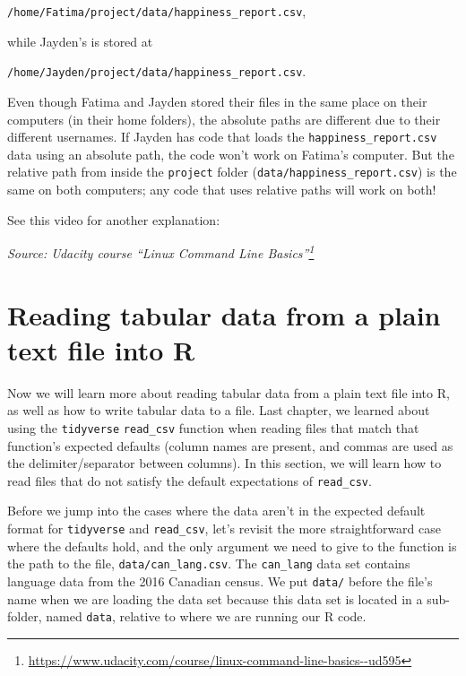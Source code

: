 \documentclass[
]{krantz}
\renewcommand{\href}[2]{#2\footnote{\url{#1}}}
\begin{document}
\texttt{/home/Fatima/project/data/happiness\_report.csv},

while Jayden's is stored at

\texttt{/home/Jayden/project/data/happiness\_report.csv}.

Even though Fatima and Jayden stored their files in the same place on their computers (in their home folders), the absolute paths are different due to their different usernames.
If Jayden has code that loads the \texttt{happiness\_report.csv} data using an absolute path, the code won't work on Fatima's computer.
But the relative path from inside the \texttt{project} folder (\texttt{data/happiness\_report.csv}) is the same on both computers; any code that uses relative paths will work on both!

See this video for another explanation:

\emph{Source: \href{https://www.udacity.com/course/linux-command-line-basics--ud595}{Udacity course ``Linux Command Line Basics''}}

\hypertarget{reading-tabular-data-from-a-plain-text-file-into-r}{%
\section{Reading tabular data from a plain text file into R}\label{reading-tabular-data-from-a-plain-text-file-into-r}}

Now we will learn more about reading tabular data from a plain text file into R, as well as how to write tabular data to a file.
Last chapter, we learned about using the \texttt{tidyverse} \texttt{read\_csv} function when reading files that match that function's expected defaults
(column names are present, and commas are used as the delimiter/separator between columns). In this section, we will learn how to read
files that do not satisfy the default expectations of \texttt{read\_csv}.

Before we jump into the cases where the data aren't in the expected default format for \texttt{tidyverse} and \texttt{read\_csv}, let's revisit the more straightforward
case where the defaults hold, and the only argument we need to give to the function is the path to the file, \texttt{data/can\_lang.csv}. The \texttt{can\_lang} data set contains language data from the 2016 Canadian census. We put \texttt{data/} before the file's name when we are loading the data set because this data set is located in a sub-folder, named \texttt{data}, relative to where we are running our R code.
\end{document}
